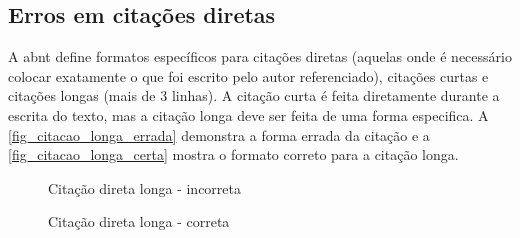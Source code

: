\subsection{Erros em citações diretas}
\label{erros-citacoes-diretas}

A \ac{abnt} define formatos específicos para citações diretas (aquelas onde é necessário colocar exatamente o que foi escrito pelo autor referenciado), citações curtas e citações longas (mais de 3 linhas). A citação curta é feita diretamente durante a escrita do texto, mas a citação longa deve ser feita de uma forma especifica. A \autoref{fig_citacao_longa_errada} demonstra a forma errada da citação e a \autoref{fig_citacao_longa_certa} mostra o formato correto para a citação longa.

\begin{figure}[hb]
    \centering
{}
    \caption{Citação direta longa - incorreta}
    \label{fig_citacao_longa_errada}
\end{figure}

\begin{figure}[hb]
    \centering
{}
    \caption{Citação direta longa - correta}
    \label{fig_citacao_longa_certa}
\end{figure}

